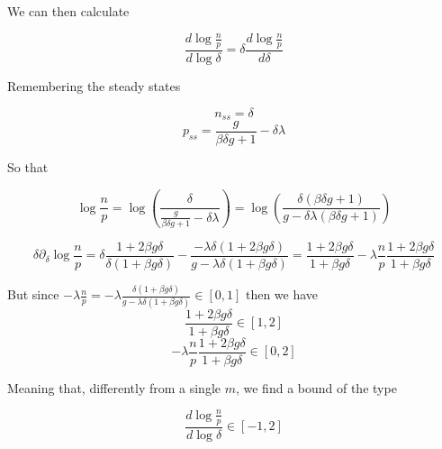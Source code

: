 \documentclass{article}
\begin{document}
	\hfill \break
	
	We can then calculate
	
	$$\frac{d \log \frac{ n}{p} }{d \log \delta}=\delta \frac{d \log \frac{ n }{p} }{d\delta}$$
	
	
	Remembering the steady states 
	
	$$n_{ss}=\delta$$
	$$p_{ss}=\frac{g}{\beta  \delta  g+1}-\delta  \lambda$$
	
	So that
	
	$$\log \frac{n}{p}=\log \left( \frac{\delta }{\frac{g}{\beta  \delta  g+1}-\delta  \lambda }\right)=\log \left(\frac{\delta( \beta  \delta  g+1) }{g-\delta  \lambda (\beta  \delta  g+1) }\right)$$
	
	$$\delta \partial_{\delta}\log \frac{n}{p}=\delta \frac{1+2\beta g \delta}{\delta (1+\beta g \delta)}- \frac{-\lambda \delta (1+2\beta g \delta)}{g- \lambda \delta (1+ \beta g \delta)}=\frac{1+2\beta g \delta}{1+\beta g \delta}-\lambda \frac{n}{p}\frac{ 1+2\beta g \delta}{ 1+ \beta g \delta}$$
	
	But since $-\lambda \frac{n}{p}= - \lambda \frac{ \delta (1+ \beta g \delta)}{g-\lambda \delta (1+ \beta g \delta)} \in [0,1]$ then we have 
	$$\frac{1+2\beta g \delta}{1+\beta g \delta} \in [1,2]$$
	$$-\lambda \frac{n}{p}\frac{ 1+2\beta g \delta}{ 1+ \beta g \delta} \in [0,2]$$
	
	Meaning that, differently from a single $m$, we find a bound of the type
	
	$$\frac{d \log \frac{ n}{p} }{d \log \delta} \in [-1,2]$$
	
	
	\printbibliography
	
\end{document}
